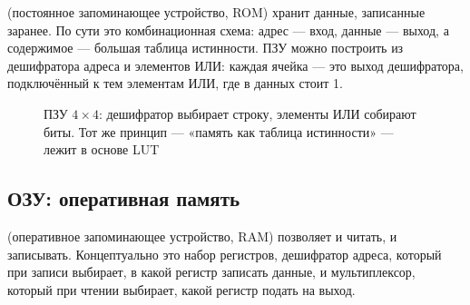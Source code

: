  (постоянное запоминающее устройство, ROM) хранит данные, записанные
заранее. По сути это комбинационная схема: адрес --- вход, данные --- выход,
а содержимое --- большая таблица истинности. ПЗУ можно построить из
дешифратора адреса и элементов ИЛИ: каждая ячейка --- это выход дешифратора,
подключённый к тем элементам ИЛИ, где в данных стоит 1.

\begin{figure}[H]
\centering
{}
\caption{ПЗУ $4\times4$: дешифратор выбирает строку, элементы ИЛИ собирают
биты. Тот же принцип --- «память как таблица истинности» --- лежит в основе LUT}
\label{fig:rom}
\end{figure}

\subsection{ОЗУ: оперативная память}

 (оперативное запоминающее устройство, RAM) позволяет и читать, и
записывать. Концептуально это набор регистров, дешифратор адреса, который при
записи выбирает, в какой регистр записать данные, и мультиплексор, который
при чтении выбирает, какой регистр подать на выход.

